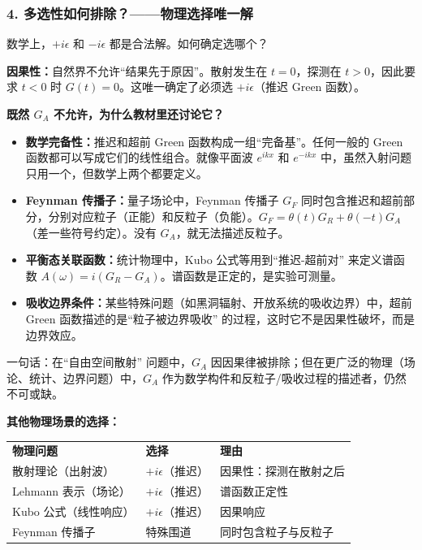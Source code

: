 \begin{derivationbox}
\subsubsection*{4. 多选性如何排除？——物理选择唯一解}

数学上，$+i\epsilon$ 和 $-i\epsilon$ 都是合法解。如何确定选哪个？

\textbf{因果性：}自然界不允许``结果先于原因''。散射发生在 $t = 0$，探测在 $t > 0$，因此要求 $t < 0$ 时 $G(t) = 0$。这唯一确定了必须选 $+i\epsilon$（推迟 Green 函数）。

\textbf{既然 $G_A$ 不允许，为什么教材里还讨论它？}
\begin{itemize}
    \item \textbf{数学完备性：}推迟和超前 Green 函数构成一组``完备基''。任何一般的 Green 函数都可以写成它们的线性组合。就像平面波 $e^{ikx}$ 和 $e^{-ikx}$ 中，虽然入射问题只用一个，但数学上两个都要定义。
    \item \textbf{Feynman 传播子：}量子场论中，Feynman 传播子 $G_F$ 同时包含推迟和超前部分，分别对应粒子（正能）和反粒子（负能）。$G_F = \theta(t)G_R + \theta(-t)G_A$（差一些符号约定）。没有 $G_A$，就无法描述反粒子。
    \item \textbf{平衡态关联函数：}统计物理中，Kubo 公式等用到``推迟-超前对'' 来定义谱函数 $A(\omega) = i(G_R - G_A)$。谱函数是正定的，是实验可测量。
    \item \textbf{吸收边界条件：}某些特殊问题（如黑洞辐射、开放系统的吸收边界）中，超前 Green 函数描述的是``粒子被边界吸收'' 的过程，这时它不是因果性破坏，而是边界效应。
\end{itemize}

一句话：在``自由空间散射'' 问题中，$G_A$ 因因果律被排除；但在更广泛的物理（场论、统计、边界问题）中，$G_A$ 作为数学构件和反粒子/吸收过程的描述者，仍然不可或缺。

\textbf{其他物理场景的选择：}

\begin{tabular}{lll}
\textbf{物理问题} & \textbf{选择} & \textbf{理由} \\
散射理论（出射波） & $+i\epsilon$（推迟） & 因果性：探测在散射之后 \\
Lehmann 表示（场论） & $+i\epsilon$（推迟） & 谱函数正定性 \\
Kubo 公式（线性响应） & $+i\epsilon$（推迟） & 因果响应 \\
Feynman 传播子 & 特殊围道 & 同时包含粒子与反粒子 \\
\end{tabular}


\end{derivationbox}
